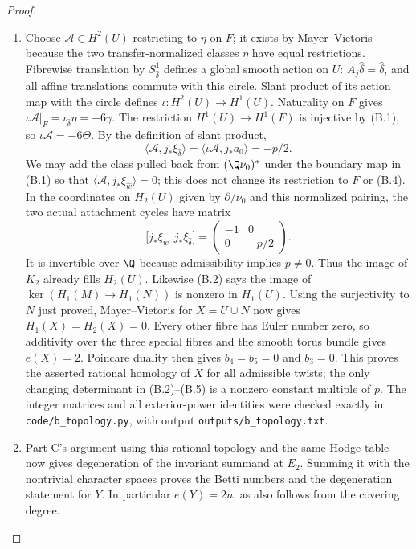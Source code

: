 \begin{proof}
\begin{enumerate}[label=\arabic*.,leftmargin=*]
\item Choose $\mathcal A\in H^2(U)$ restricting to $\eta$ on $F$;
it exists by Mayer--Vietoris because the two transfer-normalized
classes $\eta$ have equal restrictions. Fibrewise translation by
$S^1_{\hat\delta}$ defines a global smooth action on $U$:
$A_j\hat\delta=\hat\delta$, and all affine translations commute
with this circle. Slant product of its action map with the circle
defines $\iota:H^2(U)\to H^1(U)$. Naturality on $F$ gives
$\iota\mathcal A|_F=\iota_{\hat\delta}\eta=-6\gamma$.
The restriction $H^1(U)\to H^1(F)$ is injective by (B.1), so
$\iota\mathcal A=-6\Theta$. By the definition of slant product,
\[
 \langle\mathcal A,j_*\xi_{\hat\delta}\rangle
 =\langle\iota\mathcal A,j_*a_0\rangle=-p/2.           \tag{B.4}
\]
We may add the class pulled back from $(\Q\nu_0)^*$ under
the boundary map in (B.1) so that
$\langle\mathcal A,j_*\xi_{\hat w}\rangle=0$;
this does not change its restriction to $F$ or (B.4).
In the coordinates on $H_2(U)$ given by $\partial/\nu_0$ and
this normalized pairing, the two actual attachment cycles have
matrix
\[
 \bigl[j_*\xi_{\hat w}\ \ j_*\xi_{\hat\delta}\bigr]
 =\begin{pmatrix}-1&0\\0&-p/2\end{pmatrix}.             \tag{B.5}
\]
It is invertible over $\Q$ because admissibility implies
$p\ne0$. Thus the image of $K_2$ already fills $H_2(U)$.
Likewise (B.2) says the image of $\ker(H_1(M)\to H_1(N))$
is nonzero in $H_1(U)$. Using the surjectivity to $N$ just proved,
Mayer--Vietoris for $X=U\cup N$ now gives $H_1(X)=H_2(X)=0$.
Every other fibre has Euler number zero, so additivity over the
three special fibres and the smooth torus bundle gives $e(X)=2$.
Poincare duality then gives $b_4=b_5=0$ and $b_3=0$.
This proves the asserted rational homology of $X$ for all admissible
twists; the only changing determinant in (B.2)--(B.5) is a nonzero
constant multiple of $p$. The integer matrices and all exterior-power
identities were checked exactly in \texttt{code/b\_topology.py},
with output \texttt{outputs/b\_topology.txt}.

\item Part C's argument using this rational topology and the same Hodge
table now gives degeneration of the invariant summand at $E_2$.
Summing it with the nontrivial character spaces proves the Betti
numbers and the degeneration statement for $Y$. In particular
$e(Y)=2n$, as also follows from the covering degree.
\end{enumerate}
\end{proof}


